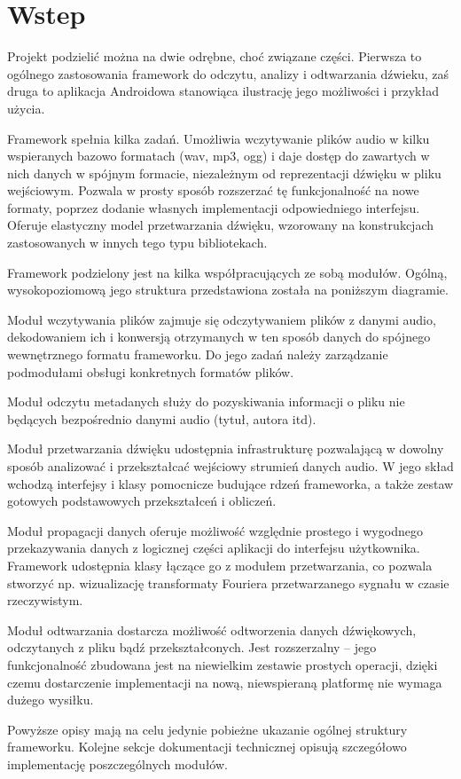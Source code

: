 
\section{Wstep}

Projekt podzielić można na dwie odrębne, choć związane części. Pierwsza to ogólnego zastosowania
framework do odczytu, analizy i odtwarzania dźwieku, zaś druga to aplikacja Androidowa stanowiąca
ilustrację jego możliwości i przykład użycia.

Framework spełnia kilka zadań. Umożliwia wczytywanie plików audio w kilku wspieranych bazowo
formatach (wav, mp3, ogg) i daje dostęp do zawartych w nich danych w spójnym formacie, niezależnym
od reprezentacji dźwięku w pliku wejściowym. Pozwala w prosty sposób rozszerzać tę funkcjonalność na
nowe formaty, poprzez dodanie własnych implementacji odpowiedniego interfejsu. Oferuje elastyczny
model przetwarzania dźwięku, wzorowany na konstrukcjach zastosowanych w innych tego typu
bibliotekach.

Framework podzielony jest na kilka współpracujących ze sobą modułów. Ogólną, wysokopoziomową jego
struktura przedstawiona została na poniższym diagramie.


Moduł wczytywania plików zajmuje się odczytywaniem plików z danymi audio, dekodowaniem ich i
konwersją otrzymanych w ten sposób danych do spójnego wewnętrznego formatu frameworku. Do jego zadań
należy zarządzanie podmodułami obsługi konkretnych formatów plików.

Moduł odczytu metadanych służy do pozyskiwania informacji o pliku nie będących bezpośrednio danymi
audio (tytuł, autora itd). 

Moduł przetwarzania dźwięku udostępnia infrastrukturę pozwalającą w dowolny sposób analizować i
przekształcać wejściowy strumień danych audio. W jego skład wchodzą interfejsy i klasy pomocnicze
budujące rdzeń frameworka, a także zestaw gotowych podstawowych przekształceń i obliczeń.

Moduł propagacji danych oferuje możliwość względnie prostego i wygodnego przekazywania danych z
logicznej części aplikacji do interfejsu użytkownika. Framework udostępnia klasy łączące go z
modułem przetwarzania, co pozwala stworzyć np. wizualizację transformaty Fouriera przetwarzanego
sygnału w czasie rzeczywistym.

Moduł odtwarzania dostarcza możliwość odtworzenia danych dźwiękowych, odczytanych z pliku bądź
przekształconych. Jest rozszerzalny -- jego funkcjonalność zbudowana jest na niewielkim zestawie
prostych operacji, dzięki czemu dostarczenie implementacji na nową, niewspieraną platformę nie
wymaga dużego wysiłku.

Powyższe opisy mają na celu jedynie pobieżne ukazanie ogólnej struktury frameworku. Kolejne sekcje
dokumentacji technicznej opisują szczegółowo implementację poszczególnych modułów.
